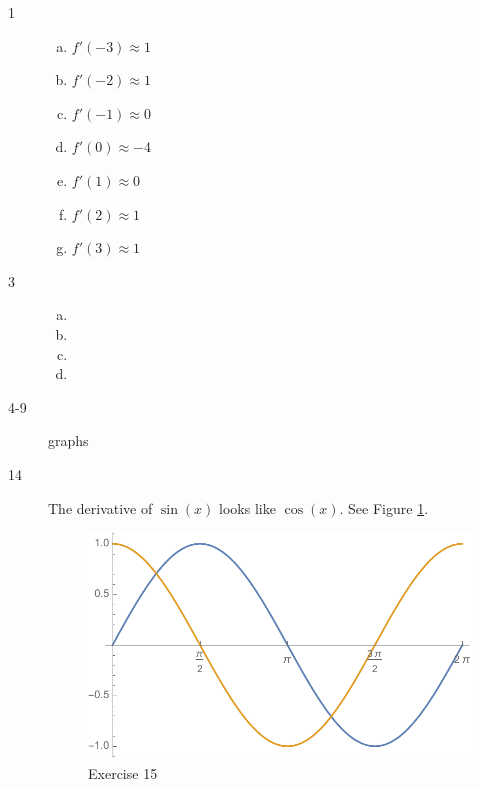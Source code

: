 \documentclass[letterpaper]{exam}
\begin{document}
    \begin{description}

      \item[1] 
        \begin{enumerate}[(a)]
          \item $f'(-3) \approx 1$
          \item $f'(-2) \approx 1$
          \item $f'(-1) \approx 0$
          \item $f'(0) \approx -4$
          \item $f'(1) \approx 0$
          \item $f'(2) \approx 1$
          \item $f'(3) \approx 1$
        \end{enumerate}

      \newpage

      \item[3] 
        \begin{enumerate}[(a)]
          \item {}
          \item {}
          \item {}
          \item {}
        \end{enumerate}

      \item[4-9] graphs

      \item[14]
        The derivative of $\sin(x)$ looks like $\cos(x)$. See Figure \ref{fig:ex14}.

        \begin{figure}[H]
          \centering
          \includegraphics[scale = 0.5]{ex14.pdf}
          \caption{Exercise 15}
          \label{fig:ex14}
        \end{figure}


\end{description}
\end{document}
